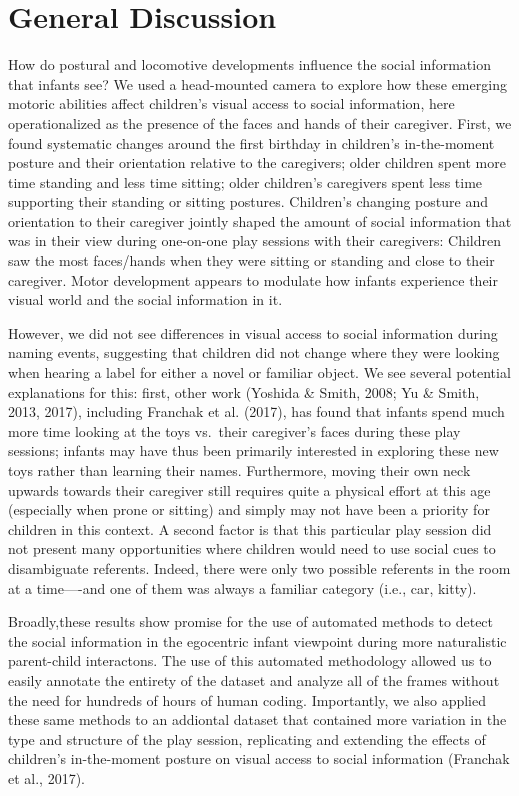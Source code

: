 \documentclass[english,man]{apa6}
\begin{document}
\section{General Discussion}\label{general-discussion}

How do postural and locomotive developments influence the social
information that infants see? We used a head-mounted camera to explore
how these emerging motoric abilities affect children's visual access to
social information, here operationalized as the presence of the faces
and hands of their caregiver. First, we found systematic changes around
the first birthday in children's in-the-moment posture and their
orientation relative to the caregivers; older children spent more time
standing and less time sitting; older children's caregivers spent less
time supporting their standing or sitting postures. Children's changing
posture and orientation to their caregiver jointly shaped the amount of
social information that was in their view during one-on-one play
sessions with their caregivers: Children saw the most faces/hands when
they were sitting or standing and close to their caregiver. Motor
development appears to modulate how infants experience their visual
world and the social information in it.

However, we did not see differences in visual access to social
information during naming events, suggesting that children did not
change where they were looking when hearing a label for either a novel
or familiar object. We see several potential explanations for this:
first, other work (Yoshida \& Smith, 2008; Yu \& Smith, 2013, 2017),
including Franchak et al. (2017), has found that infants spend much more
time looking at the toys vs.~their caregiver's faces during these play
sessions; infants may have thus been primarily interested in exploring
these new toys rather than learning their names. Furthermore, moving
their own neck upwards towards their caregiver still requires quite a
physical effort at this age (especially when prone or sitting) and
simply may not have been a priority for children in this context. A
second factor is that this particular play session did not present many
opportunities where children would need to use social cues to
disambiguate referents. Indeed, there were only two possible referents
in the room at a time----and one of them was always a familiar category
(i.e., car, kitty).

Broadly,these results show promise for the use of automated methods to
detect the social information in the egocentric infant viewpoint during
more naturalistic parent-child interactons. The use of this automated
methodology allowed us to easily annotate the entirety of the dataset
and analyze all of the frames without the need for hundreds of hours of
human coding. Importantly, we also applied these same methods to an
addiontal dataset that contained more variation in the type and
structure of the play session, replicating and extending the effects of
children's in-the-moment posture on visual access to social information
(Franchak et al., 2017).
\end{document}
